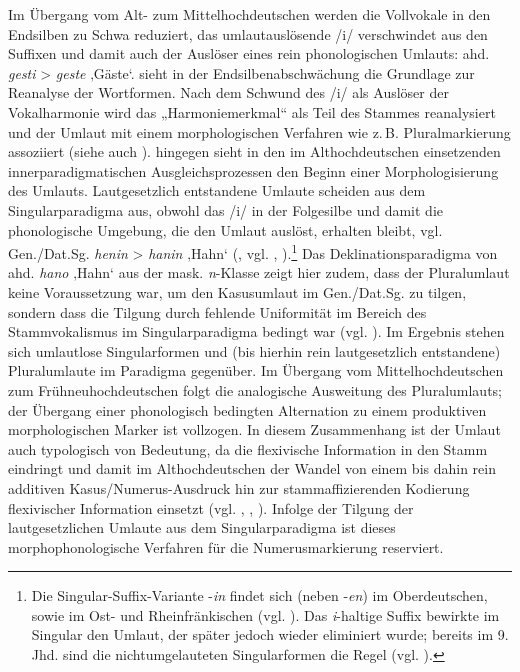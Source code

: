 Im Übergang vom Alt- zum Mittelhochdeutschen werden die Vollvokale in den Endsilben zu Schwa reduziert, das umlautauslösende /i/ verschwindet aus den Suffixen und damit auch der Auslöser eines rein phonologischen Umlauts: ahd. \textit{gesti} > \textit{geste} ‚Gäste‘. \citet[235]{Wiese1987} sieht in der Endsilbenabschwächung die Grundlage zur Reanalyse der Wortformen. Nach dem Schwund des /i/ als Auslöser der Vokalharmonie wird das „Harmoniemerkmal“ als Teil des Stammes reanalysiert und der Umlaut mit einem morphologischen Verfahren wie z.\,B. Pluralmarkierung assoziiert (siehe auch \citealt[68--69]{Wurzel1982}). \citet[60]{Wurzel1982} hingegen sieht in den im Althochdeutschen einsetzenden innerparadigmatischen Ausgleichsprozessen den Beginn einer Morphologisierung des Umlauts. Lautgesetzlich entstandene Umlaute scheiden aus dem Singularparadigma aus, obwohl das /i/ in der Folgesilbe und damit die phonologische Umgebung, die den Umlaut auslöst, erhalten bleibt, vgl. Gen./Dat.Sg. \textit{henin} > \textit{hanin} ‚Hahn‘ (, vgl. \citealt[71--72]{Dammel2018}, \citealt[308--309]{Sonderegger1979}).\footnote{Die Singular-Suffix-Variante -\textit{in} findet sich (neben -\textit{en}) im Oberdeutschen, sowie im Ost- und Rheinfränkischen (vgl. \citealt[1179]{Sonderegger2000}). Das \textit{i}{}-haltige Suffix bewirkte im Singular den Umlaut, der später jedoch wieder eliminiert wurde; bereits im 9. Jhd. sind die nichtumgelauteten Singularformen die Regel (vgl. \citealt[§221]{BrauneHeidermanns2018}).} Das Deklinationsparadigma von ahd. \textit{hano} ‚Hahn‘ aus der mask. \textit{n}{}-Klasse zeigt hier zudem, dass der Pluralumlaut keine Voraussetzung war, um den Kasusumlaut im Gen./Dat.Sg. zu tilgen, sondern dass die Tilgung durch fehlende Uniformität im Bereich des Stammvokalismus im Singularparadigma bedingt war (vgl. \citealt[49--50]{Nübling2005}). Im Ergebnis stehen sich umlautlose Singularformen und (bis hierhin rein lautgesetzlich entstandene) Pluralumlaute im Paradigma gegenüber. Im Übergang vom Mittelhochdeutschen zum Frühneuhochdeutschen folgt die analogische Ausweitung des Pluralumlauts; der Übergang einer phonologisch bedingten Alternation zu einem produktiven morphologischen Marker ist vollzogen. In diesem Zusammenhang ist der Umlaut auch typologisch von Bedeutung, da die flexivische Information in den Stamm eindringt und damit im Althochdeutschen der Wandel von einem bis dahin rein additiven Kasus/Numerus-Ausdruck hin zur stammaffizierenden Kodierung flexivischer Information einsetzt (vgl. \citealt[48]{Nübling2005}, \citealt[182]{Seiler2008}, \citealt[1691]{Solms2004}). Infolge der Tilgung der lautgesetzlichen Umlaute aus dem Singularparadigma ist dieses morphophonologische Verfahren für die Numerusmarkierung reserviert.


